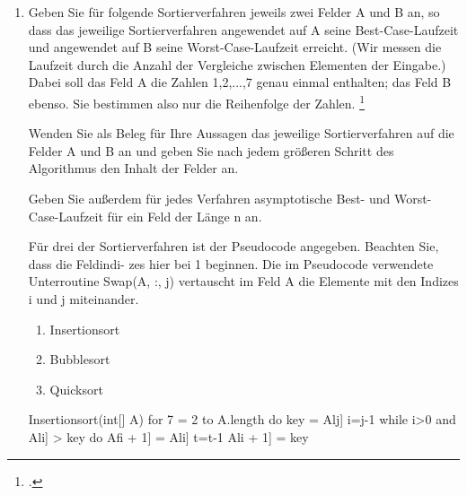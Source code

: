 \documentclass{bschlangaul-aufgabe}
\begin{document}

\begin{enumerate}


\item Geben Sie für folgende Sortierverfahren jeweils zwei Felder A und B
an, so dass das jeweilige Sortierverfahren angewendet auf A seine
Best-Case-Laufzeit und angewendet auf B seine Worst-Case-Laufzeit
erreicht. (Wir messen die Laufzeit durch die Anzahl der Vergleiche
zwischen Elementen der Eingabe.) Dabei soll das Feld A die Zahlen
1,2,...,7 genau einmal enthalten; das Feld B ebenso. Sie bestimmen also
nur die Reihenfolge der Zahlen.
\footcite{examen:46115:2021:03}

Wenden Sie als Beleg für Ihre Aussagen das jeweilige Sortierverfahren
auf die Felder A und B an und geben Sie nach jedem größeren Schritt des
Algorithmus den Inhalt der Felder an.

Geben Sie außerdem für jedes Verfahren asymptotische Best- und
Worst-Case-Laufzeit für ein Feld der Länge n an.

Für drei der Sortierverfahren ist der Pseudocode angegeben. Beachten
Sie, dass die Feldindi- zes hier bei 1 beginnen. Die im Pseudocode
verwendete Unterroutine Swap(A, :, j) vertauscht im Feld A die Elemente
mit den Indizes i und j miteinander.

\begin{enumerate}

\item Insertionsort

\item Bubblesort

\item Quicksort

\end{enumerate}
Insertionsort(int[] A)
for 7 = 2 to A.length do
key = Alj]
i=j-1
while i>0 and Ali] > key do
Afi + 1] = Ali]
t=t-1
Ali + 1] = key


\end{enumerate}
\end{document}
